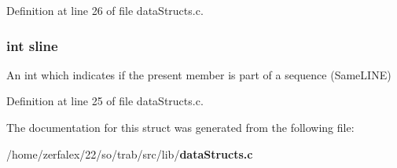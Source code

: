 Definition at line 26 of file data\+Structs.\+c.

\subsubsection[{sline}]{\setlength{\rightskip}{0pt plus 5cm}int sline}\label{structthing_a8260a04cd33e11250d7680ccd06af2fc}


An int which indicates if the present member is part of a sequence (Same\+L\+I\+NE) 



Definition at line 25 of file data\+Structs.\+c.



The documentation for this struct was generated from the following file\+:\begin{DoxyCompactItemize}
\item 
/home/zerfalex/22/so/trab/src/lib/{\bf data\+Structs.\+c}\end{DoxyCompactItemize}
